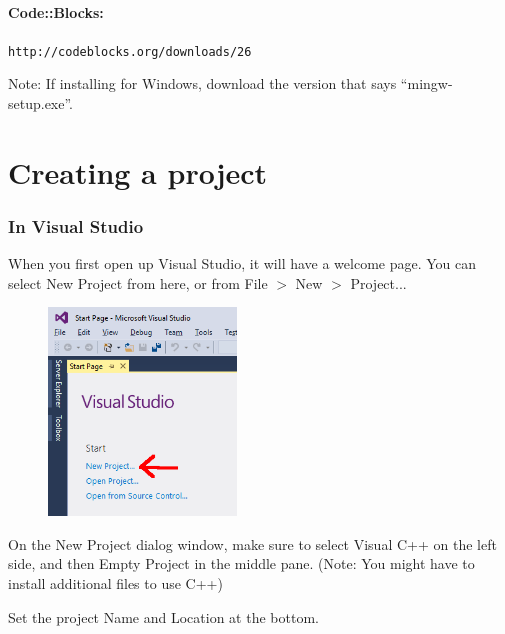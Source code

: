             \paragraph{Code::Blocks:}
                \texttt{http://codeblocks.org/downloads/26}

                Note: If installing for Windows, download the version that
                says ``mingw-setup.exe''.

        \newpage

        \section{Creating a project}

            \subsubsection{In Visual Studio}

                When you first open up Visual Studio, it will have a welcome page.
                You can select New Project from here, or from File $>$ New $>$ Project...

                \begin{figure}[h]
                    \centering
                    \includegraphics[width=5cm]{images-2018-01/vs-newproject.png}
                \end{figure}

                On the New Project dialog window, make sure to select Visual C++ on the left side,
                and then Empty Project in the middle pane.
                (Note: You might have to install additional files to use C++)

                Set the project Name and Location at the bottom.
                
